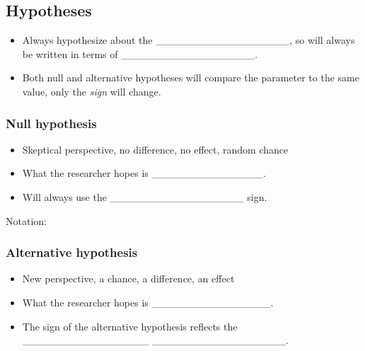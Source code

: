 \documentclass[
]{report}
\begin{document}
\subsection*{Hypotheses}\label{hypotheses}


\begin{itemize}
\item
  Always hypothesize about the \_\_\_\_\_\_\_\_\_\_\_\_\_\_\_\_\_\_, so will always be written in terms of \_\_\_\_\_\_\_\_\_\_\_\_\_\_\_\_\_\_.
\item
  Both null and alternative hypotheses will compare the parameter to the same value, only the \emph{sign} will change.
\end{itemize}


\subsubsection*{Null hypothesis}\label{null-hypothesis}

\begin{itemize}
\item
  Skeptical perspective, no difference, no effect, random chance
\item
  What the researcher hopes is \_\_\_\_\_\_\_\_\_\_\_\_\_\_\_.
\item
  Will always use the \_\_\_\_\_\_\_\_\_\_\_\_\_\_\_\_\_\_ sign.
\end{itemize}

Notation:

\vspace{0.2in}

\subsubsection*{Alternative hypothesis}\label{alternative-hypothesis}

\begin{itemize}
\item
  New perspective, a chance, a difference, an effect
\item
  What the researcher hopes is \_\_\_\_\_\_\_\_\_\_\_\_\_\_\_\_.
\item
  The sign of the alternative hypothesis reflects the \_\_\_\_\_\_\_\_\_\_\_\_\_\_\_\_\_ \_\_\_\_\_\_\_\_\_\_\_\_\_\_\_\_\_\_.
\end{itemize}
\end{document}
